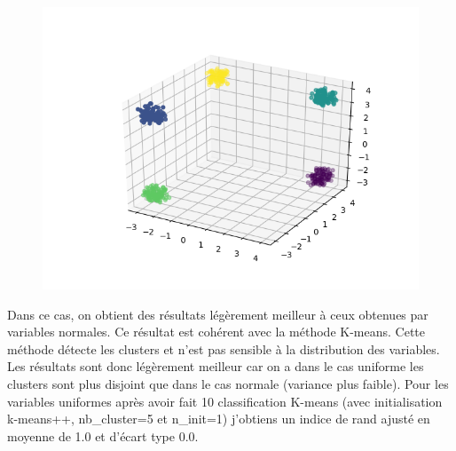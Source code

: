 \documentclass[12pt]{scrartcl} %
\begin{document}
\begin{figure}[!h]
 \centering 
\includegraphics[scale=.3]{uniform_lagKmeans.png}
\end{figure}
\newline
Dans ce cas, on obtient des résultats légèrement meilleur à ceux obtenues par variables normales. Ce résultat est cohérent avec la méthode K-means. Cette méthode détecte les clusters et n'est pas sensible à la distribution des variables. Les résultats sont donc légèrement meilleur car on a  dans le cas uniforme les clusters sont plus disjoint que dans le cas normale (variance plus faible). Pour les variables uniformes après avoir fait 10 classification K-means (avec initialisation k-means++, nb\_cluster=5 et n\_init=1) j'obtiens un indice de rand ajusté en moyenne de 1.0 et d'écart type 0.0.
\end{document}
